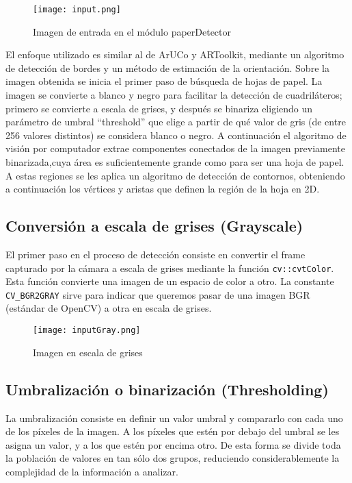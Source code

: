 \begin{figure}[h] 
  \centering
  \texttt{[image: input.png]}
  \caption{Imagen de entrada en el módulo paperDetector}
  \label{fig:input}
\end{figure}


El enfoque utilizado es similar al de ArUCo y ARToolkit, mediante un algoritmo de detección de bordes y un
método de estimación de la orientación. Sobre la imagen obtenida se inicia el primer paso de búsqueda de hojas de
papel. La imagen se convierte a blanco y negro para facilitar la detección de cuadriláteros;
primero se convierte a escala de grises, y después se binariza eligiendo un parámetro de
umbral “threshold” que elige a partir de qué valor de gris (de entre 256 valores distintos) se
considera blanco o negro. A continuación el algoritmo de visión por computador
extrae componentes conectados de la imagen previamente binarizada,cuya área es
suficientemente grande como para ser una hoja de papel. A estas regiones se les aplica un algoritmo
de detección de contornos, obteniendo a continuación los vértices y aristas que definen la
región de la hoja en 2D.


\subsection{Conversión a escala de grises (Grayscale)}
El primer paso en el proceso de detección consiste en convertir el frame capturado por la cámara a
escala de grises mediante la función \texttt{cv::cvtColor}. Esta función convierte una imagen de un
espacio de color a otro. La constante \texttt{CV\_BGR2GRAY} sirve para indicar que queremos pasar de
una imagen BGR (estándar de OpenCV) a otra en escala de grises.

\begin{figure}[h] 
  \centering
  \texttt{[image: inputGray.png]}
  \caption{Imagen en escala de grises}
  \label{fig:grayscale}
\end{figure}


\subsection{Umbralización o binarización (Thresholding)}
La umbralización consiste en definir un valor umbral y compararlo con cada uno de los píxeles de la
imagen. A los píxeles que estén por debajo del umbral se les asigna un valor, y a los que estén por
encima otro. De esta forma se divide toda la población de valores en tan sólo dos grupos, reduciendo
considerablemente la complejidad de la información a analizar.

